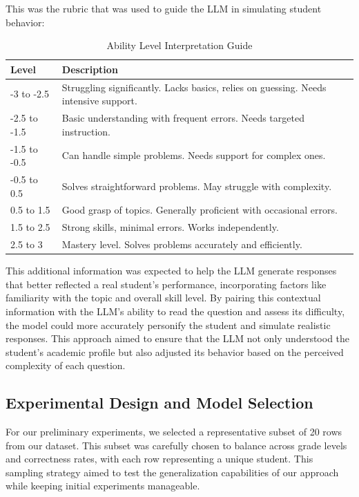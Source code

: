\documentclass[
    a4paper, %
    10pt, %
    twoside, %
]{LTJournalArticle}
\begin{document}
This was the rubric that was used to guide the LLM in simulating student behavior:

\begin{table}[H]
    \caption{Ability Level Interpretation Guide}
    \label{tab:ability-levels}
    \centering
    \scriptsize
    \begin{tabular}{p{} p{}}
        \toprule
        \textbf{Level} & \textbf{Description} \\
        \midrule
        -3 to -2.5 & Struggling significantly. Lacks basics, relies on guessing. Needs intensive support. \\
        -2.5 to -1.5 & Basic understanding with frequent errors. Needs targeted instruction. \\
        -1.5 to -0.5 & Can handle simple problems. Needs support for complex ones. \\
        -0.5 to 0.5 & Solves straightforward problems. May struggle with complexity. \\
        0.5 to 1.5 & Good grasp of topics. Generally proficient with occasional errors. \\
        1.5 to 2.5 & Strong skills, minimal errors. Works independently. \\
        2.5 to 3 & Mastery level. Solves problems accurately and efficiently. \\
        \bottomrule
    \end{tabular}
\end{table}

This additional information was expected to help the LLM generate responses that better reflected a real student's performance, incorporating factors like familiarity with the topic and overall skill level. By pairing this contextual information with the LLM's ability to read the question and assess its difficulty, the model could more accurately personify the student and simulate realistic responses. This approach aimed to ensure that the LLM not only understood the student's academic profile but also adjusted its behavior based on the perceived complexity of each question.

\subsection{Experimental Design and Model Selection}
For our preliminary experiments, we selected a representative subset of 20 rows from our dataset. This subset was carefully chosen to balance across grade levels and correctness rates, with each row representing a unique student. This sampling strategy aimed to test the generalization capabilities of our approach while keeping initial experiments manageable.
\end{document}
